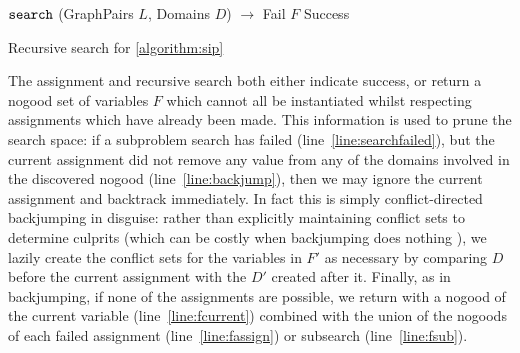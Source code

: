 \documentclass{llncs}
\newcommand{\lineref}[1]{line~\ref{#1}}
\begin{document}
\begin{algorithm}[h]
\DontPrintSemicolon
{}
\nl $\FuncSty{search}$ (GraphPairs $L$, Domains $D$) $\rightarrow$ Fail $F$  Success \;
\nl {}
\caption{Recursive search for \cref{algorithm:sip}}
\label{algorithm:search}
\end{algorithm}

The assignment and recursive search both either indicate success, or return a nogood set of
variables $F$ which cannot all be instantiated whilst respecting assignments which have already been
made. This information is used to prune the search space: if a subproblem search has failed
(\lineref{line:searchfailed}), but the current assignment did not remove any value from any of the
domains involved in the discovered nogood (\lineref{line:backjump}), then we may ignore the current
assignment and backtrack immediately.  In fact this is simply conflict-directed backjumping
\cite{Prosser:1993a} in disguise: rather than explicitly maintaining conflict sets to determine
culprits (which can be costly when backjumping does nothing \cite{Bessiere:1996,Gent:2010}), we
lazily create the conflict sets for the variables in $F'$ as necessary by comparing $D$ before the
current assignment with the $D'$ created after it. Finally, as in backjumping, if none of the
assignments are possible, we return with a nogood of the current variable (\lineref{line:fcurrent})
combined with the union of the nogoods of each failed assignment (\lineref{line:fassign}) or
subsearch (\lineref{line:fsub}).
\end{document}
